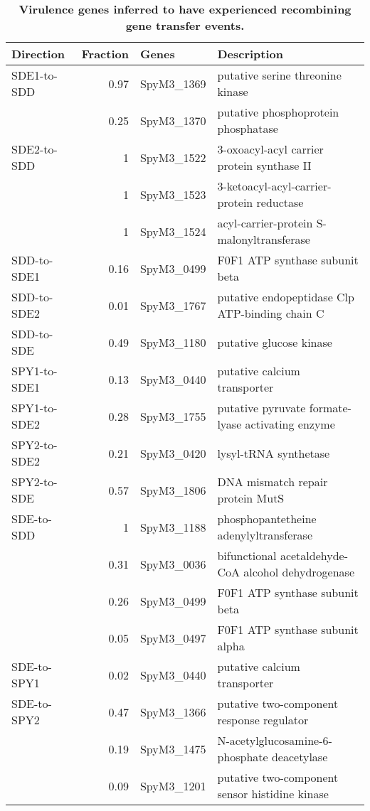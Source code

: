 \documentclass[10pt]{article}
\begin{document}
\begin{table}[!ht]
\caption{
{\bf Virulence genes inferred to have experienced recombining gene transfer
events.}}
\noindent \begin{centering}
\begin{tabular}{lrll}
\hline 
Direction & Fraction & Genes & Description\\ 
\hline 
SDE1-to-SDD & 0.97 & SpyM3\_1369 & putative serine threonine kinase\\
 & 0.25 & SpyM3\_1370 & putative phosphoprotein phosphatase\\
SDE2-to-SDD & 1 & SpyM3\_1522 & 3-oxoacyl-acyl carrier protein synthase II\\
 & 1 & SpyM3\_1523 & 3-ketoacyl-acyl-carrier-protein reductase\\
 & 1 & SpyM3\_1524 & acyl-carrier-protein S-malonyltransferase\\
SDD-to-SDE1 & 0.16 & SpyM3\_0499 & F0F1 ATP synthase subunit beta\\
SDD-to-SDE2 & 0.01 & SpyM3\_1767 & putative endopeptidase Clp ATP-binding chain C\\
SDD-to-SDE & 0.49 & SpyM3\_1180 & putative glucose kinase\\
SPY1-to-SDE1 & 0.13 & SpyM3\_0440 & putative calcium transporter\\
SPY1-to-SDE2 & 0.28 & SpyM3\_1755 & putative pyruvate formate-lyase activating enzyme\\
SPY2-to-SDE2 & 0.21 & SpyM3\_0420 & lysyl-tRNA synthetase\\
SPY2-to-SDE & 0.57 & SpyM3\_1806 & DNA mismatch repair protein MutS\\
SDE-to-SDD & 1 & SpyM3\_1188 & phosphopantetheine adenylyltransferase\\
 & 0.31 & SpyM3\_0036 & bifunctional acetaldehyde-CoA alcohol dehydrogenase\\
 & 0.26 & SpyM3\_0499 & F0F1 ATP synthase subunit beta\\
 & 0.05 & SpyM3\_0497 & F0F1 ATP synthase subunit alpha\\
SDE-to-SPY1 & 0.02 & SpyM3\_0440 & putative calcium transporter\\
SDE-to-SPY2 & 0.47 & SpyM3\_1366 & putative two-component response regulator\\
 & 0.19 & SpyM3\_1475 & N-acetylglucosamine-6-phosphate deacetylase\\
 & 0.09 & SpyM3\_1201 & putative two-component sensor histidine kinase\\

\end{tabular}
\end{centering}
\end{table}
\end{document}
